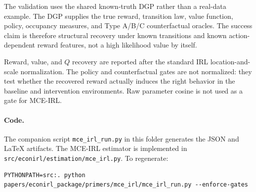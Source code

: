 \documentclass[10pt]{article}
\begin{document}


The validation uses the shared known-truth DGP rather than a real-data
example. The DGP supplies the true reward, transition law, value function,
policy, occupancy measures, and Type A/B/C counterfactual oracles. The success
claim is therefore structural recovery under known transitions and known
action-dependent reward features, not a high likelihood value by itself.

Reward, value, and \(Q\) recovery are reported after the standard IRL
location-and-scale normalization. The policy and counterfactual gates are not
normalized: they test whether the recovered reward actually induces the right
behavior in the baseline and intervention environments. Raw parameter cosine is
not used as a gate for MCE-IRL.

\paragraph{Code.}
The companion script \texttt{mce\_irl\_run.py} in this folder generates the
JSON and \LaTeX{} artifacts. The MCE-IRL estimator is implemented in
\texttt{src/econirl/estimation/mce\_irl.py}. To regenerate:
\begin{verbatim}
PYTHONPATH=src:. python papers/econirl_package/primers/mce_irl/mce_irl_run.py --enforce-gates
\end{verbatim}




\end{document}
